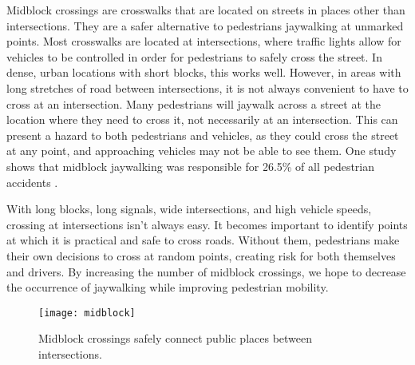 Midblock crossings are crosswalks that are located on streets in places other than intersections.  They are a safer alternative to pedestrians jaywalking at unmarked points.  Most crosswalks are located at intersections, where traffic lights allow for vehicles to be controlled in order for pedestrians to safely cross the street.  In dense, urban locations with short blocks, this works well.  However, in areas with long stretches of road between intersections, it is not always convenient to have to cross at an intersection.  Many pedestrians will jaywalk across a street at the location where they need to cross it, not necessarily at an intersection.  This can present a hazard to both pedestrians and vehicles, as they could cross the street at any point, and approaching vehicles may not be able to see them.  One study shows that midblock jaywalking was responsible for 26.5\% of all pedestrian accidents \cite{mid1}.

With long blocks, long signals, wide intersections, and high vehicle speeds, crossing at intersections isn’t always easy.  It becomes important to identify points at which it is practical and safe to cross roads.  Without them, pedestrians make their own decisions to cross at random points, creating risk for both themselves and drivers.  By increasing the number of midblock crossings, we hope to decrease the occurrence of jaywalking while improving pedestrian mobility.

\begin{figure}[!htbp]
\centering
\texttt{[image: midblock]}
\caption[Midblock Crossing]{Midblock crossings safely connect public places between intersections.}\label{fig:midblock}
\end{figure}


